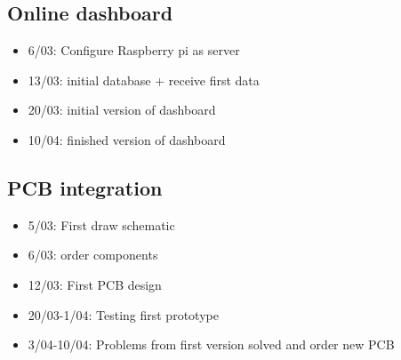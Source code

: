 \documentclass[]{article}
\begin{document}
	\subsection{Online dashboard}
	\begin{itemize}
		\item 6/03: Configure Raspberry pi as server
		\item 13/03: initial database + receive first data
		\item 20/03: initial version of dashboard
		\item 10/04: finished version of dashboard
	\end{itemize}

	\subsection{PCB integration}
	\begin{itemize}
		\item 5/03: First draw schematic
		\item 6/03: order components
		\item 12/03: First PCB design
		\item 20/03-1/04: Testing first prototype
		\item 3/04-10/04: Problems from first version solved and order new PCB 
	\end{itemize}
\end{document}

